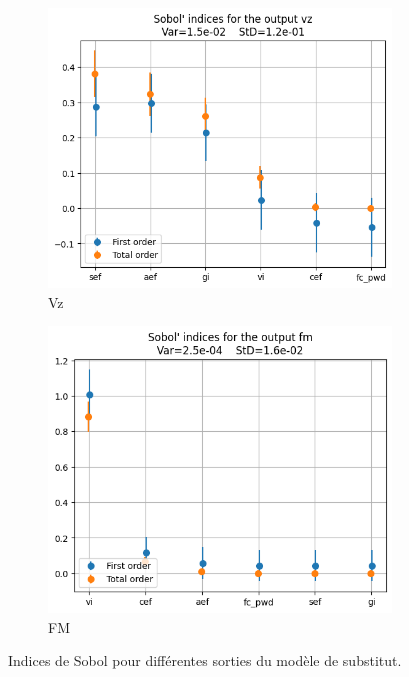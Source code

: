 \documentclass[a4paper, 11pt]{article}
\begin{document}
\begin{figure}[H]
    \vspace{10pt} %

    \begin{subfigure}[b]{0.45\textwidth}
        \includegraphics[width=\textwidth]{Images_Ayoub/Problem2/UseCase2/Sobol_Indices/vz.png}
        \caption{Vz}
        \label{fig:vz}
    \end{subfigure}
    \hfill
    \begin{subfigure}[b]{0.45\textwidth}
        \includegraphics[width=\textwidth]{Images_Ayoub/Problem2/UseCase2/Sobol_Indices/fm.png}
        \caption{FM}
        \label{fig:fm}
    \end{subfigure}

    \caption{Indices de Sobol pour différentes sorties du modèle de substitut.}
    \label{fig:sobol_indices}
\end{figure}
\end{document}

